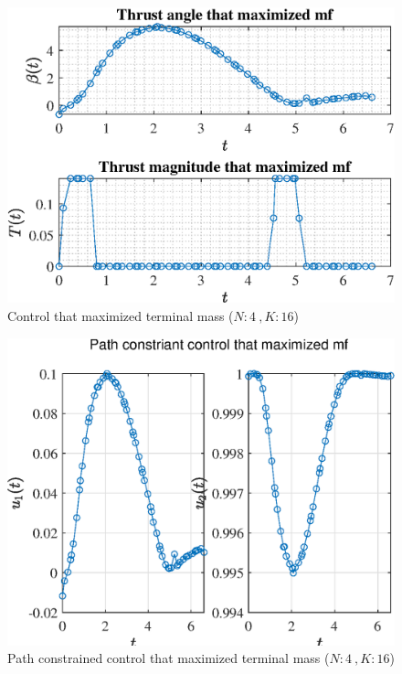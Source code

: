 \documentclass[]{article}
\begin{document}
	\begin{figure}
		\centering
		\includegraphics[scale=0.75]{control_N4_K16_C3_mf.eps}
		\caption{Control that maximized terminal mass (\(N:4\ , K:16\))}
		\label{fig:control_N4_K16_C3_mf}
	\end{figure}
	\begin{figure}
		\centering
		\includegraphics[scale=0.75]{path_N4_K16_C3_mf.eps}
		\caption{Path constrained control that maximized terminal mass (\(N:4\ , K:16\))}
		\label{fig:path_N4_K16_C3_mf}
	\end{figure}
\end{document}
